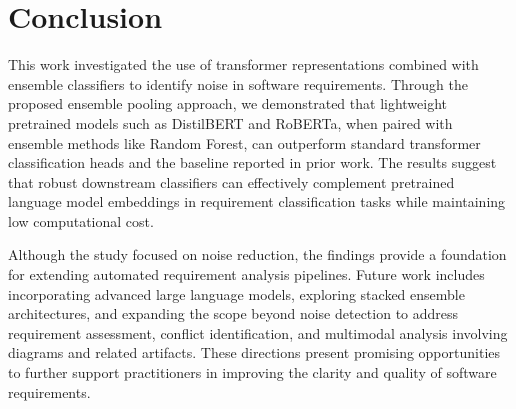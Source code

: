 \documentclass[sigconf,review]{acmart}
\begin{document}
\section{Conclusion}
\label{Conclusion}

This work investigated the use of transformer representations combined with ensemble classifiers to identify noise in software requirements. Through the proposed ensemble pooling approach, we demonstrated that lightweight pretrained models such as DistilBERT and RoBERTa, when paired with ensemble methods like Random Forest, can outperform standard transformer classification heads and the baseline reported in prior work. The results suggest that robust downstream classifiers can effectively complement pretrained language model embeddings in requirement classification tasks while maintaining low computational cost.

Although the study focused on noise reduction, the findings provide a foundation for extending automated requirement analysis pipelines. Future work includes incorporating advanced large language models, exploring stacked ensemble architectures, and expanding the scope beyond noise detection to address requirement assessment, conflict identification, and multimodal analysis involving diagrams and related artifacts. These directions present promising opportunities to further support practitioners in improving the clarity and quality of software requirements.




\end{document}
